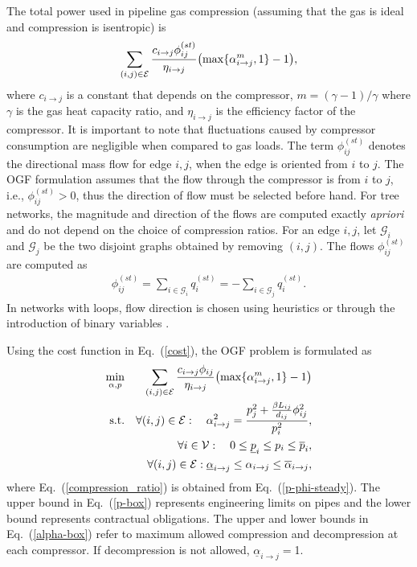 \documentclass[10pt, conference, compsocconf]{IEEEtran}
\begin{document}
The total power used in pipeline gas compression (assuming that the gas is ideal and compression is isentropic) is
\begin{eqnarray}
\sum_{(i, j) \in \cal{E}} \frac{ c_{i \to j} \phi_{ij}^{(st)}} {\eta_{i \to j}} { \left( \max\{\alpha_{i \to j}^m,1\}-1\right)},\label{cost}
\end{eqnarray}
where $c_{i \to j}$ is a constant that depends on the compressor, $m = (\gamma - 1)/ \gamma$ where $\gamma$ is the gas heat capacity ratio, and $\eta_{i \to j}$ is the efficiency factor of the compressor. It is important to note that fluctuations caused by compressor consumption are negligible when compared to gas loads. The term $\phi_{ij}^{(st)}$ denotes the {directional mass} flow for edge $i,j$, when the edge is oriented from $i$ to $j$. The OGF formulation assumes that
the flow through the compressor is from $i$ to $j$, i.e., $\phi_{ij}^{(st)} > 0$, thus the direction of flow must be selected before hand. For tree networks, the magnitude and direction of the flows are computed exactly {\it apriori} and do not depend on the choice of compression ratios. For an edge $i,j$, let $\mathcal{G}_i$ and
$\mathcal{G}_j$ be the two disjoint graphs obtained by removing $(i,j)$. The flows $\phi_{ij}^{(st)}$ are computed as \begin{align} \label{flowcomputation}
	\phi_{ij}^{(st)}=\sum_{i\in\mathcal{G}_i} q_i^{(st)}=-\sum_{i\in\mathcal{G}_j} q_i^{(st)}.
\end{align}
In networks with loops, flow direction is chosen using heuristics or through the introduction of binary variables \cite{10Bor}.

Using the cost function in Eq.~(\ref{cost}), the OGF problem is formulated as
\begin{eqnarray}
\min_{\alpha, p} & &  \sum_{(i,j)\in{\cal E}} \frac{ c_{i \to j} \phi_{ij}}{\eta_{i \to j}}{ \left( \max\{\alpha_{i \to j}^m,1\}-1\right)} \label{obj} \\ \mbox{s.t.} & & \forall (i,j)\in{\cal E}:\quad \alpha_{i \to j}^2 =
\frac{p_j^2 + \frac{\beta L_{ij}}{d_{ij}}  \phi_{ij}^2}{p_i^2 }, \label{compression_ratio} \\
&& \forall i\in{\cal V}:\quad 0\leq \underline{p}_i\leq p_i\leq \overline{p}_i,
\label{p-box}\\
&& \forall (i,j)\in{\cal E}:  {\underline{\alpha}_{i \to j}} \leq  \alpha_{i \to j}\leq \overline{\alpha}_{i \to j}, \label{alpha-box}
\end{eqnarray}
where Eq.~(\ref{compression_ratio}) is obtained from Eq.~(\ref{p-phi-steady}).
The upper bound in Eq.~(\ref{p-box}) represents engineering limits on pipes and the lower bound represents contractual obligations. The upper and lower bounds in Eq.~(\ref{alpha-box}) refer to maximum allowed compression and decompression at each compressor.  If decompression is not allowed, $\underline{\alpha}_{i \to j}=$1.
\end{document}
